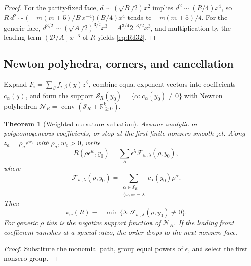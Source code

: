 \documentclass[11pt,a4paper]{article}
\newtheorem{theorem}{Theorem}[section]
\theoremstyle{definition}
\theoremstyle{remark}
\newcommand{\RR}{\mathbb{R}}
\begin{document}
\begin{proof}
For the parity-fixed face, \(d\sim(\sqrt B/2)x^2\) implies
\(d^2\sim(B/4)x^4\), so \(R\,d^2\sim\bigl(-m(m+5)/B\,x^{-4}\bigr)(B/4)x^4\)
tends to \(-m(m+5)/4\). For the generic face,
\(d^{3/2}\sim(\sqrt A/2)^{3/2}x^3=A^{3/4}2^{-3/2}x^3\), and multiplication by
the leading term \((\mathcal D/A)x^{-3}\) of \(R\) yields
\eqref{eq:Rd32}.
\end{proof}

\subsection{Newton polyhedra, corners, and cancellation}

Expand \(F_i=\sum_\beta f_{i,\beta}(y)z^\beta\), combine equal exponent vectors into
coefficients \(c_\alpha(y)\), and form the support
\(\mathcal S_R(y_0)=\{\alpha:c_\alpha(y_0)\neq0\}\) with Newton polyhedron
\(\mathcal N_R=\operatorname{conv}(\mathcal S_R+\RR_{\ge0}^k)\).

\begin{theorem}[Weighted curvature valuation]
\label{thm:weighted}
Assume analytic or polyhomogeneous coefficients, or stop at the first finite
nonzero smooth jet. Along \(z_a=\rho_a\epsilon^{w_a}\) with \(\rho_a,w_a>0\),
write
\[
R(\rho\epsilon^w,y_0)
=
\sum_\lambda\epsilon^\lambda
\mathcal F_{w,\lambda}(\rho,y_0),
\]
where
\[
\mathcal F_{w,\lambda}(\rho,y_0)
=
\sum_{\substack{\alpha\in\mathcal S_R\\
\langle w,\alpha\rangle=\lambda}}
c_\alpha(y_0)\rho^\alpha.
\]
Then
\begin{equation}
\boxed{
\kappa_w(R)
=
-\min\bigl\{\lambda:\mathcal F_{w,\lambda}(\rho,y_0)\neq0\bigr\}.
}
\label{eq:kappaw}
\end{equation}
For generic \(\rho\) this is the negative support function of \(\mathcal N_R\).
If the leading front coefficient vanishes at a special ratio, the order drops
to the next nonzero face.
\end{theorem}

\begin{proof}
Substitute the monomial path, group equal powers of \(\epsilon\), and select
the first nonzero group.
\end{proof}
\end{document}
